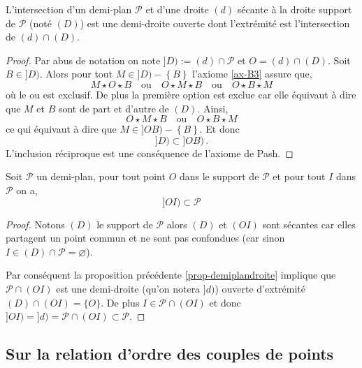 \begin{prop}\label{prop-demiplandroite}
    L'intersection d'un demi-plan $\mathcal{P}$ et d'une droite $(d)$ sécante à la droite support de $\mathcal{P}$ (noté $(D)$) est une demi-droite ouverte dont l'extrémité est l'intersection de $(d)\cap(D)$.
\begin{proof}
    Par abus de notation on note $]D) := (d) \cap \mathcal{P}$ et $O = (d)\cap(D)$. Soit $B\in ]D)$. Alors pour tout $M \in ]D)-\left\{B\right\}$ l'axiome \ref{ax-B3} assure que,
    \begin{equation*}
        M \star O \star B \quad \text{ou}\quad O \star M \star B \quad \text{ou}\quad O \star B \star M
    \end{equation*}
    où le ou est exclusif. De plus la première option est exclue car elle équivaut à dire que $M$ et $B$ sont de part et d'autre de $(D)$. Ainsi,
    \begin{equation*}
        O \star M \star B \quad \text{ou}\quad O \star B \star M
    \end{equation*}
    ce qui équivaut à dire que $M\in ]OB)-\left\{B\right\}$. Et donc $$]D)\subset ]OB)\,.$$ L'inclusion réciproque est une conséquence de l'axiome de Pash. 
\end{proof}
\end{prop}
\begin{prop}\label{prop-demidroitedemiplan}
    Soit $\mathcal{P}$ un demi-plan, pour tout point $O$ dans le support de $\mathcal{P}$ et pour tout $I$ dans $\mathcal{P}$ on a,
    \begin{equation*}
        ]OI)\subset\mathcal{P}
    \end{equation*}
\begin{proof}
    Notons $(D)$ le support de $\mathcal{P}$ alors $(D)$ et $(OI)$ sont sécantes car elles partagent un point commun et ne sont pas confondues (car sinon $I\in(D)\cap\mathcal{P}=\varnothing$). 

    Par conséquent la proposition précédente \ref{prop-demiplandroite} implique que $\mathcal{P}\cap (OI)$ est une demi-droite (qu'on notera $]d)$) ouverte d'extrémité $(D)\cap (OI)=\{O\}$. De plus $I\in \mathcal{P}\cap (OI)$ et donc $]OI)=]d)=\mathcal{P}\cap (OI)\subset \mathcal{P}$.
\end{proof}
\end{prop}

        \subsection{Sur la relation d'ordre des couples de points}\label{subsec-ordresegment}

